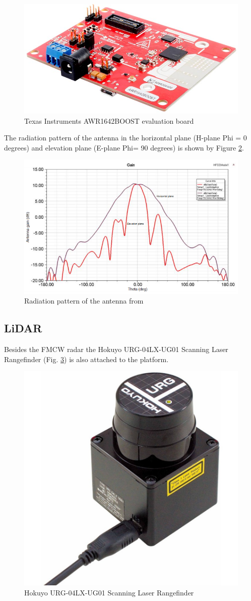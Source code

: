 \begin{figure}[ht!] 
\centerline{\includegraphics [width=0.5 \textwidth]{imgs/chapter4/awr1642.jpg}}
\caption{Texas Instruments AWR1642BOOST evaluation board}
\label{fig:awr}
\end{figure}


The radiation pattern of the antenna in the horizontal plane (H-plane Phi = 0 degrees) and elevation plane (E-plane Phi= 90 degrees) is shown by Figure \ref{fig:el}.
\begin{figure}[ht!] 
\centerline{\includegraphics [width=0.9 \textwidth]{imgs/chapter4/elevation.png}}
\caption[Radiation pattern of the antenna]{Radiation pattern of the antenna from \cite{el}}
\label{fig:el}
\end{figure}

\subsection{LiDAR}
Besides the \ac{FMCW} \ac{radar} the Hokuyo URG-04LX-UG01 Scanning Laser Rangefinder (Fig. \ref{fig:lidar}) is also attached to the platform.

\begin{figure}[ht!] 
\centerline{\includegraphics [width=0.5 \textwidth]{imgs/chapter4/lidar.jpg}}
\caption{Hokuyo URG-04LX-UG01 Scanning Laser Rangefinder}
\label{fig:lidar}
\end{figure}

